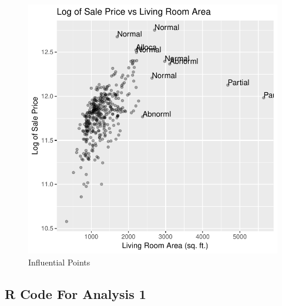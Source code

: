 \documentclass[american,]{article}
\theoremstyle{definition}
\theoremstyle{definition}
\theoremstyle{definition}
\theoremstyle{remark}
\begin{document}
\begin{figure}[htbp]

{\centering \includegraphics[width=0.5\linewidth]{HousePriceRegressionAnalysis_files/figure-latex/infleu-points-1} 

}

\caption{Influential Points}\label{fig:infleu-points}
\end{figure}

\newpage

\hypertarget{r-code-for-analysis-1}{%
\subsection{R Code For Analysis 1}\label{r-code-for-analysis-1}}
\end{document}

